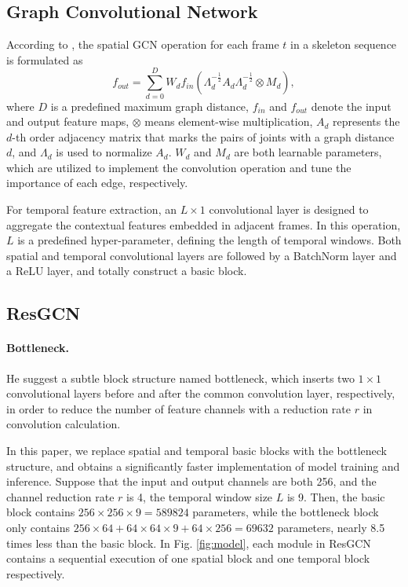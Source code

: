 \documentclass[sigconf]{acmart}
\begin{document}
\subsection{Graph Convolutional Network}
\label{ssec:gcn}

According to \cite{yan2018spatial}, the spatial GCN operation for each frame $t$ in a skeleton sequence is formulated as
\begin{equation}\label{eq:gcn}
f_{out}=\sum_{d=0}^{D} W_d f_{in} (\Lambda_d^{-\frac{1}{2}}A_d\Lambda_d^{-\frac{1}{2}} \otimes M_d),
\end{equation}
where $D$ is a predefined maximum graph distance, $f_{in}$ and $f_{out}$ denote the input and output feature maps, $\otimes$ means element-wise multiplication, $A_d$ represents the $d$-th order adjacency matrix that marks the pairs of joints with a graph distance $d$, and $\Lambda_d$ is used to normalize $A_d$. $W_d$ and $M_d$ are both learnable parameters, which are utilized to implement the convolution operation and tune the importance of each edge, respectively.

For temporal feature extraction, an $L\times1$ convolutional layer is designed to aggregate the contextual features embedded in adjacent frames. In this operation, $L$ is a predefined hyper-parameter, defining the length of temporal windows. Both spatial and temporal convolutional layers are followed by a BatchNorm layer and a ReLU layer, and totally construct a basic block.

\subsection{ResGCN}
\label{ssec:details}

\paragraph{Bottleneck.} He \etal \cite{he2016deep} suggest a subtle block structure named bottleneck, which inserts two $1\times1$ convolutional layers before and after the common convolution layer, respectively, in order to reduce the number of feature channels with a reduction rate $r$ in convolution calculation.

In this paper, we replace spatial and temporal basic blocks with the bottleneck structure, and obtains a significantly faster implementation of model training and inference. Suppose that the input and output channels are both 256, and the channel reduction rate $r$ is 4, the temporal window size $L$ is 9. Then, the basic block contains $256\times256\times9=589824$ parameters, while the bottleneck block only contains $256\times64+64\times64\times9+64\times256=69632$ parameters, nearly 8.5 times less than the basic block. In Fig. \ref{fig:model}, each module in ResGCN contains a sequential execution of one spatial block and one temporal block respectively.
\end{document}
